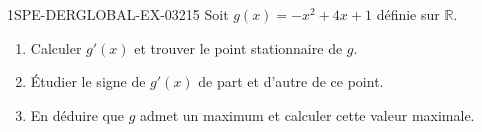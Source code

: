 \begin{exercice}{1SPE-DERGLOBAL-EX-032}{1}{5}
Soit $g(x) = -x^2 + 4x + 1$ définie sur $\mathbb{R}$.
\begin{enumerate}
\item Calculer $g'(x)$ et trouver le point stationnaire de $g$.
\item Étudier le signe de $g'(x)$ de part et d'autre de ce point.
\item En déduire que $g$ admet un maximum et calculer cette valeur maximale.
\end{enumerate}
\end{exercice}
